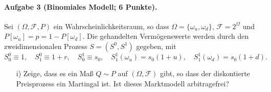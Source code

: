 \documentclass{article}
\begin{document}
\paragraph{Aufgabe 3 \textnormal{(Binomiales Modell; 6 Punkte)}.}
Sei $(\Omega,\mathscr{F},P)$ ein Wahr\-schein\-lich\-keits\-raum, so dass $\Omega=\{\omega_u,\omega_d\}$, $\mathscr{F}=2^\Omega$ und $P[\omega_u]=p=1-P[\omega_d]$.
Die gehandelten Vermögenswerte werden durch den zweidimensionalen Pro\-zess $S=(S^0,S^1)$ gegeben, mit
\begin{equation}
  \label{eq:a3s}
  S_0^0\equiv1,\quad S^0_1\equiv1+r,\quad S^1_0\equiv s_0,\quad S^1_1(\omega_u)=s_0(1+u),\quad S_1^1(\omega_d)=s_0(1+d).
\end{equation}
\begin{itemize}
\item [i)] Zeige, dass es ein Maß $Q\sim P$ auf $(\Omega,\mathscr{F})$ gibt, so dass der dis\-kon\-tier\-te Preisprozess ein Martingal ist.
  Ist dieses Marktmodell arbitragefrei?
\end{itemize}
\end{document}
